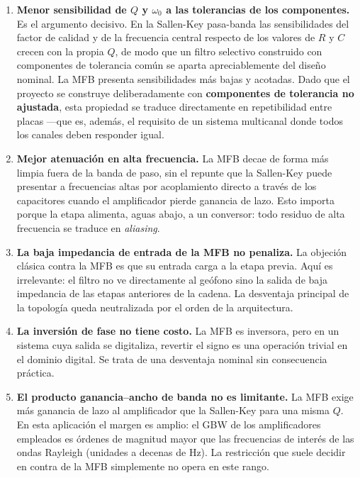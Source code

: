 \begin{enumerate}[itemsep=0.3em]
    \item \textbf{Menor sensibilidad de $Q$ y $\omega_0$ a las tolerancias de los
    componentes.} Es el argumento decisivo. En la Sallen-Key pasa-banda las sensibilidades
    del factor de calidad y de la frecuencia central respecto de los valores de $R$ y $C$
    crecen con la propia $Q$, de modo que un filtro selectivo construido con componentes
    de tolerancia com\'un se aparta apreciablemente del dise\~no nominal. La MFB presenta
    sensibilidades m\'as bajas y acotadas. Dado que el proyecto se construye
    deliberadamente con \textbf{componentes de tolerancia no ajustada}, esta propiedad se
    traduce directamente en repetibilidad entre placas ---que es, adem\'as, el requisito
    de un sistema multicanal donde todos los canales deben responder igual.

    \item \textbf{Mejor atenuaci\'on en alta frecuencia.} La MFB decae de forma m\'as
    limpia fuera de la banda de paso, sin el repunte que la Sallen-Key puede presentar a
    frecuencias altas por acoplamiento directo a trav\'es de los capacitores cuando el
    amplificador pierde ganancia de lazo. Esto importa porque la etapa alimenta,
    aguas abajo, a un conversor: todo residuo de alta frecuencia se traduce en
    \emph{aliasing}.

    \item \textbf{La baja impedancia de entrada de la MFB no penaliza.} La objeci\'on
    cl\'asica contra la MFB es que su entrada carga a la etapa previa. Aqu\'i es irrelevante:
    el filtro no ve directamente al ge\'ofono sino la salida de baja impedancia de las
    etapas anteriores de la cadena. La desventaja principal de la topolog\'ia queda
    neutralizada por el orden de la arquitectura.

    \item \textbf{La inversi\'on de fase no tiene costo.} La MFB es inversora, pero en un
    sistema cuya salida se digitaliza, revertir el signo es una operaci\'on trivial en el
    dominio digital. Se trata de una desventaja nominal sin consecuencia pr\'actica.

    \item \textbf{El producto ganancia--ancho de banda no es limitante.} La MFB exige m\'as
    ganancia de lazo al amplificador que la Sallen-Key para una misma $Q$. En esta
    aplicaci\'on el margen es amplio: el GBW de los amplificadores empleados es \'ordenes de
    magnitud mayor que las frecuencias de inter\'es de las ondas Rayleigh
    (unidades a decenas de \si{\hertz}). La restricci\'on que suele decidir en contra de la
    MFB simplemente no opera en este rango.
\end{enumerate}

